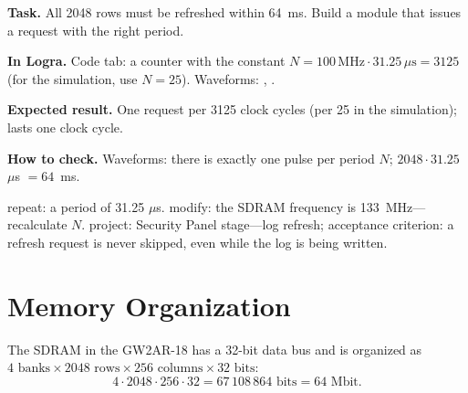 \begin{diybox}
\textbf{Task.} All 2048 rows must be refreshed within 64~ms. Build a module that issues a  request with the right period.

\textbf{In Logra.} Code tab: a counter with the constant $N = 100\,\text{MHz} \cdot 31.25\,\mu\text{s} = 3125$ (for the simulation, use $N=25$). Waveforms: , .

\textbf{Expected result.} One request per 3125 clock cycles (per 25 in the simulation);  lasts one clock cycle.

\textbf{How to check.} Waveforms: there is exactly one pulse per period $N$; $2048\cdot 31.25$~$\mu$s $=64$~ms.

 repeat: a period of 31.25 $\mu$s.  modify: the SDRAM frequency is 133~MHz---recalculate $N$.  project: Security Panel stage---log refresh; acceptance criterion: a refresh request is never skipped, even while the log is being written.
\end{diybox}

\section{Memory Organization}

The SDRAM in the GW2AR-18 has a 32-bit data bus and is organized as
$4 \text{ banks} \times 2048 \text{ rows} \times 256 \text{ columns}
\times 32 \text{ bits}$:
\[
  4 \cdot 2048 \cdot 256 \cdot 32 = 67\,108\,864 \text{ bits} = 64 \text{ Mbit}.
\]

